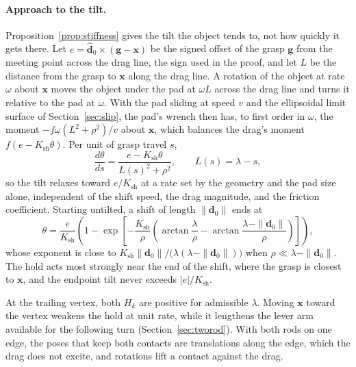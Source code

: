 \paragraph{Approach to the tilt.}
Proposition~\ref{prop:stiffness} gives the tilt the object tends to, not how quickly it gets there. Let $e=\hat{\mathbf d}_0\times(\mathbf g-\mathbf x)$ be the signed offset of the grasp $\mathbf g$ from the meeting point across the drag line, the sign used in the proof, and let $L$ be the distance from the grasp to $\mathbf x$ along the drag line. A rotation of the object at rate $\omega$ about $\mathbf x$ moves the object under the pad at $\omega L$ across the drag line and turns it relative to the pad at $\omega$. With the pad sliding at speed $v$ and the ellipsoidal limit surface of Section~\ref{sec:slip}, the pad's wrench then has, to first order in $\omega$, the moment $-f\omega(L^2+\rho^2)/v$ about $\mathbf x$, which balances the drag's moment $f(e-K_{\mathrm{sh}}\theta)$. Per unit of grasp travel $s$,
\begin{equation}
  \frac{d\theta}{ds}=\frac{e-K_{\mathrm{sh}}\theta}{L(s)^2+\rho^2},\qquad L(s)=\lambda-s,
  \label{eq:relax}
\end{equation}
so the tilt relaxes toward $e/K_{\mathrm{sh}}$ at a rate set by the geometry and the pad size alone, independent of the shift speed, the drag magnitude, and the friction coefficient. Starting untilted, a shift of length $\|\mathbf d_0\|$ ends at
\begin{equation}
  \theta=\frac{e}{K_{\mathrm{sh}}}\left(1-\exp\left[-\frac{K_{\mathrm{sh}}}{\rho}\left(\arctan\frac{\lambda}{\rho}-\arctan\frac{\lambda-\|\mathbf d_0\|}{\rho}\right)\right]\right),
  \label{eq:relax_end}
\end{equation}
whose exponent is close to $K_{\mathrm{sh}}\|\mathbf d_0\|/\bigl(\lambda(\lambda-\|\mathbf d_0\|)\bigr)$ when $\rho\ll\lambda-\|\mathbf d_0\|$. The hold acts most strongly near the end of the shift, where the grasp is closest to $\mathbf x$, and the endpoint tilt never exceeds $|e|/K_{\mathrm{sh}}$.

At the trailing vertex, both $H_k$ are positive for admissible $\lambda$. Moving $\mathbf x$ toward the vertex weakens the hold at unit rate, while it lengthens the lever arm available for the following turn (Section~\ref{sec:tworod}). With both rods on one edge, the poses that keep both contacts are translations along the edge, which the drag does not excite, and rotations lift a contact against the drag.

